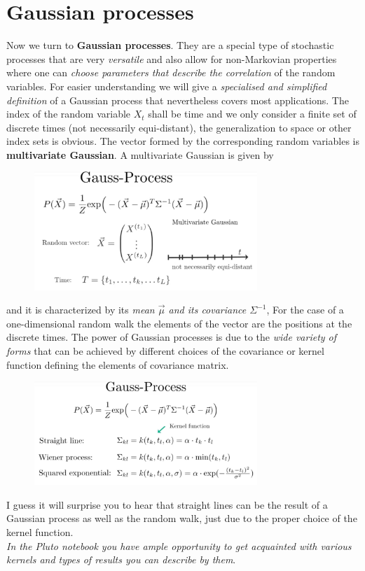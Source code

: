 \documentclass[12pt, a4paper]{scrartcl}
\begin{document}
\section*{Gaussian processes}
Now we turn to \textbf{Gaussian processes}. They are a special type of stochastic processes that are very \textit{versatile} and also allow for non-Markovian properties where one can \textit{choose parameters that describe the correlation} of the random variables.
For easier understanding we will give a \textit{specialised and simplified definition} of a Gaussian process that nevertheless covers most applications.
The index of the random variable $X_t$ shall be time and we only consider a finite set of discrete times (not necessarily equi-distant), the generalization to space or other index sets is obvious.
The vector formed by the corresponding random variables is \textbf{multivariate Gaussian}.
A multivariate Gaussian is given by %
 \begin{figure}[H]
	\centering
	\includegraphics[width=0.75\textwidth]{5_12.png}
\end{figure}
 and it is characterized by its \textit{mean $\vec{\mu}$ and its covariance $\Sigma^{-1}$},
For the case of a one-dimensional random walk the elements of the vector are the positions at the discrete times.  
The power of Gaussian processes is due to the \textit{wide variety of forms} that can be achieved by different choices of the covariance or kernel function defining the elements of covariance matrix.%
 \begin{figure}[H]
	\centering
	\includegraphics[width=0.75\textwidth]{5_13.png}
\end{figure}
I guess it will surprise you to hear that straight lines can be the result of a Gaussian process as well as the random walk, just due to the proper choice of the kernel function.\\
\textit{In the Pluto notebook you have ample opportunity to get acquainted with various kernels and types of results you can describe by them}.\\
\end{document}
